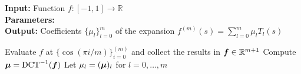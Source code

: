 \hspace*{\algorithmicindent} \textbf{Input:} Function $f:[-1, 1] \to \mathbb{R}$ \\%
\hspace*{\algorithmicindent} \textbf{Parameters:}  \\
\hspace*{\algorithmicindent} \textbf{Output:} Coefficients $\{ \mu_l \}_{l=0}^{m}$ of the expansion $f^{(m)}(s) = \sum_{l=0}^{m} \mu_l T_l(s)$
\begin{algorithmic}[1]
    \State Evaluate $f$ at $\{\cos(\pi i / m)\}_{i=0}^{(m)}$ and collect the results in $\boldsymbol{f}\in \mathbb{R}^{m+1}$
    \State Compute $\boldsymbol{\mu} = \operatorname{DCT}^{-1}(\boldsymbol{f})$
    \State Let $\mu_l = (\boldsymbol{\mu})_l$ for $l=0,\dots,m$
\end{algorithmic}
